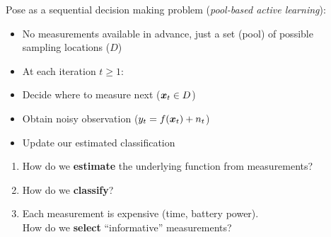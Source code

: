 \documentclass[10pt,mathserif]{beamer}
\begin{document}
\begin{frame}
Pose as a sequential decision making problem (\emph{pool-based active learning}):
\begin{itemize}
\item<2-> No measurements available in advance, just a set (pool) of possible\\sampling locations ($D$)
\vspace{0.5em}
\item<3->[]\hspace{-1.5em} At each iteration $t \geq 1$:
\item<3-> Decide where to measure next ($\bm{x}_t \in D$)
\item<4-> Obtain noisy observation ($y_t = f(\bm{x}_t) + n_t$)
\item<5-> Update our estimated classification
\end{itemize}
\end{frame}

\begin{frame}
\begin{enumerate}
\item<1-> How do we \textbf{estimate} the underlying function from measurements?
\vspace{1em}
\item<2-> How do we \textbf{classify}?
\vspace{1em}
\item<3-> Each measurement is expensive (time, battery power).\\
      How do we \textbf{select} ``informative'' measurements?
\end{enumerate}
\vspace{2em}
\begin{center}
\end{center}
\end{frame}
\end{document}
